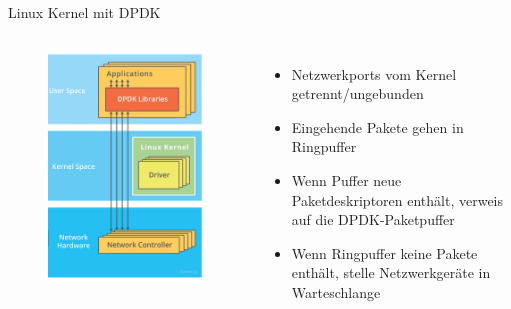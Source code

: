 \documentclass{beamer}
\begin{document}
\begin{frame}{Linux Kernel mit DPDK}
    \begin{columns}
        \begin{figure}[h]
            \centering
            \includegraphics[width=\linewidth]{img/kernel_and_dpdk.png}
        \end{figure}
        \begin{itemize}
            \item Netzwerkports vom Kernel getrennt/ungebunden
            \item Eingehende Pakete gehen in Ringpuffer
            \item Wenn Puffer neue Paketdeskriptoren enthält, verweis auf die DPDK-Paketpuffer
            \item Wenn Ringpuffer keine Pakete enthält, stelle Netzwerkgeräte in Warteschlange

\end{itemize}
\end{columns}
\end{frame}
\end{document}
